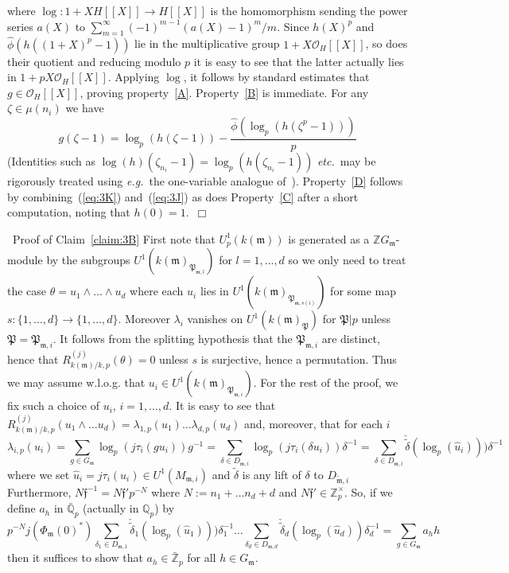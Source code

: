 \documentclass[12pt]{article}
\newcounter{rem}[section]%
\newcommand{\barbbQ}{\ensuremath{\bar{\bbQ}}}
\newcommand{\bbQ}{\ensuremath{\mathbb{Q}}}
\newcommand{\bbZ}{\ensuremath{\mathbb{Z}}}
\newcommand{\beql}[1]{\begin{equation}\label{#1}}
\newcommand{\cO}{\ensuremath{\mathcal{O}}}
\newcommand{\eeq}{\end{equation}}
\newcommand{\eg}{\emph{e.g.}}
\newcommand{\ePf}{\hspace*{\fill}~$\Box$\vertsp\par}%
\newcommand{\etc}{\emph{etc.}}
\newcommand{\ff}{\ensuremath{\mathfrak{f}}}
\newcommand{\fm}{\ensuremath{\mathfrak{m}}}
\newcommand{\fP}{\ensuremath{\mathfrak{P}}}
\newcommand{\inv}{^{-1}}%
\newcommand{\refeq}[1]{~(\ref{eq:#1})}
\newcommand{\rem}{\refstepcounter{rem}\noindent{\sc Remark \therem}}%
\renewcommand{\therem}{\thesection.\arabic{rem}}
\newcommand{\vertsp}{\vspace{1ex}}
\newcommand{\tfm}{\ensuremath{{\tilde{\fm}}}}
\begin{document}
where $\log:1+XH[[X]]\rightarrow H[[X]]$ is the homomorphism
sending the power series $a(X)$ to $\sum_{m=1}^\infty(-1)^{m-1}(a(X)-1)^m/m$.
Since $h(X)^p$ and $\hat{\phi}(h((1+X)^p-1))$ lie in the multiplicative group
$1+X\cO_H[[X]]$, so does their quotient and reducing modulo $p$ it is easy to see that
the latter actually lies in $1+pX\cO_H[[X]]$. Applying $\log$, it follows by
standard estimates that $g\in\cO_H[[X]]$, proving property~\ref{A}. Property~\ref{B}
is immediate.
For any $\zeta\in\mu(n_i)$ we have
\beql{eq:3K}
g(\zeta-1)=\log_p(h(\zeta-1))-\frac{\hat{\phi}(\log_p(h(\zeta^p-1)))}{p}
\eeq
(Identities such
as $\log(h)(\zeta_{n_i}-1)=\log_p(h(\zeta_{n_i}-1))$ \etc~may be rigorously treated
using \eg\ the one-variable analogue of~\cite[Prop.~5.3]{p-adic lims}).
Property~\ref{D}
follows by combining\refeq{3K} and\refeq{3J} as does Property~\ref{C} after a short computation,
noting that $h(0)=1$.\ePf
\noindent\ {\sc Proof of Claim~\ref{claim:3B}}
First note that $U^1_p(k(\fm))$ is generated as a $\bbZ G_\fm$-module
by the subgroups $U^1(k(\fm)_{\fP_{\fm,l}})$ for $l=1,\ldots,d$ so we only need
to treat the case $\theta=u_1\wedge\ldots\wedge u_d$ where each $u_i$ lies in
$U^1(k(\fm)_{\fP_{\fm,s(i)}})$ for some map $s:\{1,\ldots,d\}\rightarrow\{1,\ldots,d\}$.
Moreover
$\lambda_i$ vanishes on $U^1(k(\fm)_{\fP})$ for $\fP|p$ unless $\fP=\fP_{\fm,i}$.
It follows from the splitting hypothesis
that
the $\fP_{\fm,i}$ are distinct, hence that
$R^{(j)}_{k(\fm)/k,p}(\theta)=0$ unless $s$ is surjective, hence a permutation.
Thus we may assume w.l.o.g. that $u_i\in U^1(k(\fm)_{\fP_{\fm,i}})$. For the rest of the proof, we
fix such a choice of $u_i$, $i=1,\ldots,d$. It is easy to see that
$R^{(j)}_{k(\fm)/k,p}(u_1\wedge\ldots u_d)=\lambda_{1,p}(u_1)\ldots\lambda_{d,p}(u_d)$
and, moreover, that for each $i$
\[
\lambda_{i,p}(u_i)=
\sum_{g\in G_\fm}\log_p(j\tau_i(gu_i))g\inv=
\sum_{\delta\in D_{\fm,i}}\log_p(j\tau_i(\delta u_i))\delta \inv=
\sum_{\delta\in D_{\fm,i}}\check{\tilde{\delta}}(\log_p(\hat{u}_i)))\delta\inv
\]
where we set $\hat{u}_i=j\tau_i(u_i)\in U^1(M_{\fm,i})$
and $\tilde{\delta}$ is any lift of $\delta$ to $D_{\tfm,i}$
Furthermore, $N\ff\inv=N\ff'p^{-N}$ where $N:=n_1+\ldots n_d+d$ and
$N\ff'\in\bbZ_p^\times$. So, if we define $a_h$ in
$\barbbQ_p$ (actually in $\bbQ_p$)
by
\beql{eq:3L}
p^{-N}j(\Phi_\fm(0)^\ast)
\sum_{\delta_1\in D_{\fm,1}}\check{\tilde{\delta}}_1(\log_p(\hat{u}_1)))\delta_1\inv
\ldots\sum_{\delta_d\in D_{\fm,d}}\check{\tilde{\delta}}_d(\log_p(\hat{u}_d))\delta_d\inv=
\sum_{g\in G_\fm}a_hh
\eeq
then it suffices to show that $a_h\in \bar{\bbZ}_p$ for all $h\in G_\fm$.
\end{document}
